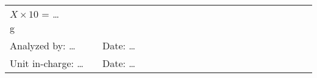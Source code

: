 \documentclass[12pt]{article}\usepackage[]{graphicx}\usepackage[]{color}
\begin{document}
\begin{table}[h]
{\begin{minipage}{1\textwidth}
\begin{tabular}{|llllllllllll|llllllllllllllll}
  \multicolumn{3}{l|}{$X \times 10$ = \ldots g} &
   &
   &
   &
   &
   &
   &
   &
   &
   &
   &
   &
   &
   &
   &
   &
   \\ \cline{1-12}
\multicolumn{6}{|l|}{Analyzed by: \ldots} &
  \multicolumn{6}{l|}{Date: \ldots} &
   &
   &
   &
   &
   &
   &
   &
   &
   &
   &
   &
   &
   &
   &
   &
   \\ \cline{1-12}
\multicolumn{6}{|l|}{Unit in-charge: \ldots} &
  \multicolumn{6}{l|}{Date: \ldots} &
   &
   &
   &
   &
   &
   &
   &
   &
   &
   &
   &
   &
   &
   &
   &
   \\ \cline{1-12}
\end{tabular}%
\end{minipage}}
\end{table}
\clearpage


\clearpage
\end{document}
